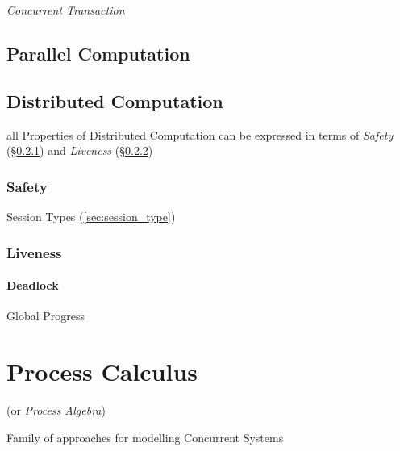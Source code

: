 \emph{Concurrent Transaction}



\subsection{Parallel Computation}\label{sec:parallel_computation}

\subsection{Distributed Computation}\label{sec:distributed_computation}

all Properties of Distributed Computation can be expressed in terms of
\emph{Safety} (\S\ref{sec:safety}) and \emph{Liveness}
(\S\ref{sec:liveness})



\subsubsection{Safety}\label{sec:safety}

\fist Session Types (\ref{sec:session_type})



\subsubsection{Liveness}\label{sec:liveness}

\paragraph{Deadlock}\label{sec:deadlock}\hfill

Global Progress



\section{Process Calculus}\label{sec:process_calculus}

(or \emph{Process Algebra})

Family of approaches for modelling Concurrent Systems

